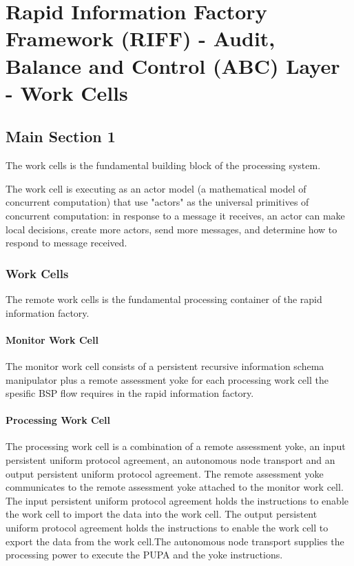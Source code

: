 
\chapter{Rapid Information Factory Framework (RIFF) - Audit, Balance and Control (ABC) Layer - Work Cells} %

\label{Chapter28} %



\section{Main Section 1}

The work cells \cite{feld2000lean} is the fundamental building block of the processing system.

The work cell is executing as an actor model (a mathematical model of concurrent computation) that use "actors" as the universal primitives of concurrent computation: in response to a message it receives, an actor can make local decisions, create more actors, send more messages, and determine how to respond to message received.

\subsection{Work Cells}
The remote work cells is the fundamental processing container of the rapid information factory.
\subsubsection{Monitor Work Cell}
The monitor work cell consists of a persistent recursive information schema manipulator plus a remote assessment yoke for each processing work cell the spesific BSP flow requires in the rapid information factory.
\subsubsection{Processing Work Cell}
The processing work cell is a combination of a remote assessment yoke, an input persistent uniform protocol agreement, an autonomous node transport and an output persistent uniform protocol agreement. The remote assessment yoke communicates to the remote assessment yoke attached to the monitor work cell. The input persistent uniform protocol agreement holds the instructions to enable the work cell to import the data into the work cell. The output persistent uniform protocol agreement holds the instructions to enable the work cell to export the data from the work cell.The autonomous node transport supplies the processing power to execute the PUPA and the yoke instructions.
